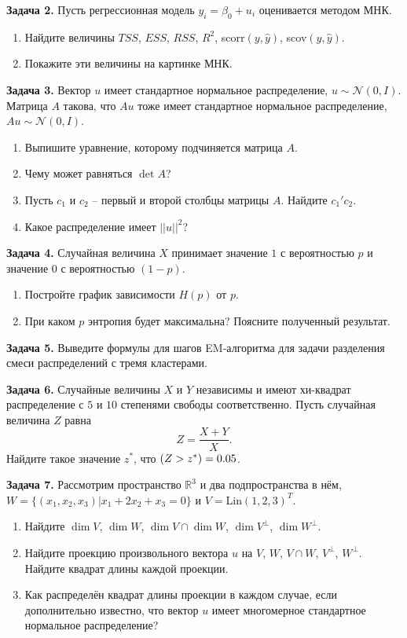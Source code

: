 \documentclass[10pt, a4paper]{extarticle}
\let\P\relax
\DeclareMathOperator{\P}{\mathbb{P}}
\def \R{\mathbb{R}}
\begin{document}
	{\large \textbf{Задача 2.}} Пусть регрессионная модель $y_i = \beta_0 + u_i$ оценивается методом МНК. 
	\begin{enumerate}
		\item Найдите величины $TSS$, $ESS$, $RSS$, $R^2$, scorr$(y, \hat{y})$, scov$(y, \hat{y})$.
		\item Покажите эти величины на картинке МНК.
	\end{enumerate}
	\vspace{1em}
	
	{\large \textbf{Задача 3.}} Вектор $u$ имеет стандартное нормальное распределение, $u \sim \mathcal{N}(0, I)$. Матрица $A$ такова, что $Au$ тоже имеет стандартное нормальное распределение, $Au \sim \mathcal{N}(0, I)$.
	\begin{enumerate}
		\item Выпишите уравнение, которому подчиняется матрица $A$.
		\item Чему может равняться $\det A$?
		\item Пусть $c_1$ и $c_2$ -- первый и второй столбцы матрицы $A$. Найдите $c_1'c_2$.
		\item Какое распределение имеет $||u||^2$?
	\end{enumerate}
	\vspace{1em}

	{\large \textbf{Задача 4.}} Случайная величина $X$ принимает значение $1$ с вероятностью $p$ и значение $0$ с вероятностью $(1-p)$.
	\begin{enumerate}
		\item Постройте график зависимости $H(p)$ от $p$.
		\item При каком $p$ энтропия будет максимальна? Поясните полученный результат.
	\end{enumerate}
	\vspace{1em}

	{\large \textbf{Задача 5.}} Выведите формулы для шагов EM-алгоритма для задачи разделения смеси распределений с тремя кластерами.
	\vspace{1em}
	
	{\large \textbf{Задача 6.}} Случайные величины $X$ и $Y$ независимы и имеют хи-квадрат распределение с $5$ и $10$ степенями свободы соответственно. Пусть случайная величина $Z$ равна
	\[
		Z = \dfrac{X+Y}{X}.
	\]
   Найдите такое значение $z^*$, что $\P(Z > z^*) = 0.05$. 
   \vspace{1em}
   
   {\large \textbf{Задача 7.}} Рассмотрим пространство $\R^3$ и два подпространства в нём, $W = \{(x_1, x_2, x_3) | x_1 + 2x_2 + x_3 = 0\}$ и $V = $Lin$(1, 2, 3)^T$. 
   \begin{enumerate}
   	\item Найдите $\dim V$, $\dim W$, $\dim V \cap \dim W$, $\dim V^{\perp}$, $\dim W^{\perp}$.
   	\item Найдите проекцию произвольного вектора $u$ на $V$, $W$, $V \cap W$, $V^{\perp}$, $W^{\perp}$. Найдите квадрат длины каждой проекции.
   	\item Как распределён квадрат длины проекции в каждом случае, если дополнительно известно, что вектор $u$ имеет многомерное стандартное нормальное распределение?
   \end{enumerate}
	
\end{document}
